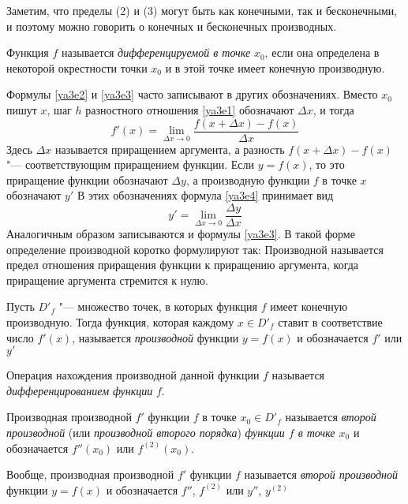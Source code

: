 Заметим, что пределы (2) и (3) могут быть как конечными, так и бесконечными, и поэтому можно говорить о конечных и бесконечных производных. 
\begin{defn} Функция $f$ называется \textit{дифференцируемой в точке} $x_0$, если она определена в некоторой окрестности точки $x_0$ и в этой точке имеет конечную производную.
\end{defn}
Формулы \eqref{ya3e2} и \eqref{ya3e3} часто записывают в других обозначениях. Вместо $x_0$ пишут $x$, шаг $h$ разностного отношения \eqref{ya3e1} обозначают $\Delta x$, и тогда	
\begin{equation}\label{ya3e4}
f'(x)=\lim_{\Delta x\to 0}\limits\frac{f(x+\Delta x)-f(x)}{\Delta x}
\end{equation}
Здесь $\Delta x$ называется приращением аргумента, а разность $f(x+\Delta x)-f(x)$ "--- соответствующим приращением функции. Если $y = f(x)$, то это приращение функции обозначают $\Delta y$, а производную функции $f$ в точке $x$ обозначают $y'$ В этих обозначениях формула \eqref{ya3e4} принимает вид
$$
y'=\lim_{\Delta x \to 0}\limits \frac{\Delta y}{\Delta x}
$$
Аналогичным образом записываются и формулы \eqref{ya3e3}. В такой форме определение производной коротко формулируют так:
Производной называется предел отношения приращения функции к приращению аргумента, когда приращение аргумента стремится к нулю.	

\begin{defn}
Пусть $D'_f$ "--- множество точек, в которых функция $f$ имеет конечную производную. Тогда функция, которая каждому $x \in D'_f$ ставит в соответствие число $f'(x)$, называется \textit{производной} функции $y=f(x)$ и обозначается $f'$ или $y'$
\end{defn}
Операция нахождения производной данной функции $f$ называется \textit{дифференцированием функции} $f$.


\begin{defn}
Производная производной $f'$ функции $f$ в точке $x_0 \in D'_f$ называется \textit{второй производной} (или \textit{производной второго порядка}) \textit{функции $f$ в точке $x_0$} и обозначается $f''(x_0)$ или $f^{(2)}(x_0)$.
\end{defn}
Вообще, производная производной $f'$ функции $f$ называется \textit{второй производной} функции $y=f(x)$ и обозначается $f''$, $f^{(2)}$ или $y''$, $y^{(2)}$

